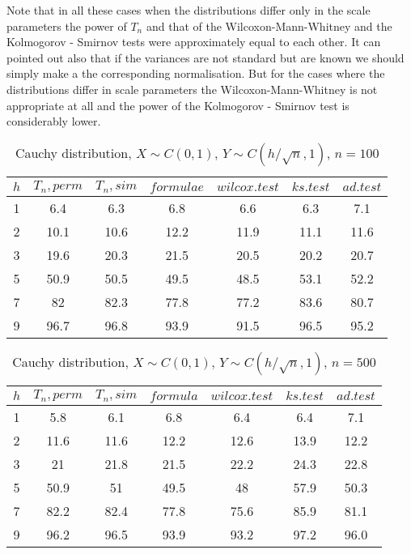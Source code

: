 \documentclass{svproc}
\begin{document}
Note that in all these cases when the distributions differ only in the scale parameters the power of  $T_n$ and  that of the Wilcoxon-Mann-Whitney and the
Kolmogorov - Smirnov tests were approximately equal to each other.
It can pointed out also that if the variances are not standard  but are known we should simply make a the corresponding normalisation.
But for the cases where the distributions differ in scale parameters the Wilcoxon-Mann-Whitney is not appropriate at all and the power of  the Kolmogorov - Smirnov test is considerably lower.


\begin{table}
  \caption{Cauchy distribution, $X\sim C(0,1)$, $Y\sim C(h/\sqrt{n},1)$, $n=100$}
  \begin{center}
  \begin{tabular}{c@{\quad}c@{\quad}c@{\quad}c@{\quad}c@{\quad}c@{\quad}c}
  \hline
  $h$ & $T_n, perm$ & $T_n, sim$ & $formulae$ & $wilcox.test$ & $ks.test$ & $ad.test$ \\
  \hline
  1 & 6.4 & 6.3 & 6.8 & 6.6 & 6.3 & 7.1\\
  2 & 10.1 & 10.6 & 12.2 & 11.9 & 11.1 & 11.6 \\
  3 & 19.6 & 20.3 & 21.5 & 20.5 & 20.2 & 20.7 \\
  5 & 50.9 & 50.5 & 49.5 & 48.5 & 53.1 & 52.2 \\
  7 & 82 & 82.3 & 77.8 & 77.2 & 83.6 & 80.7 \\
  9 & 96.7 & 96.8 & 93.9 & 91.5 & 96.5 & 95.2 \\
  \hline
  \end{tabular}
  \end{center}
\end{table}

\begin{table}
  \caption{Cauchy distribution, $X\sim C(0,1)$, $Y\sim C(h/\sqrt{n},1)$, $n=500$}
  \begin{center}
  \begin{tabular}{c@{\quad}c@{\quad}c@{\quad}c@{\quad}c@{\quad}c@{\quad}c}
  \hline
  $h$ & $T_n, perm$ & $T_n, sim$ & $formula$ & $wilcox.test$ & $ks.test$ & $ad.test$ \\
  \hline
  1 & 5.8   & 6.1      & 6.8       & 6.4           & 6.4      & 7.1 \\
  2 & 11.6  & 11.6     & 12.2      & 12.6          & 13.9     & 12.2 \\
  3 & 21    & 21.8     & 21.5      & 22.2          & 24.3     & 22.8 \\
  5 & 50.9  & 51       & 49.5      & 48            & 57.9     & 50.3 \\
  7 & 82.2  & 82.4     & 77.8      & 75.6          & 85.9     & 81.1 \\
  9 & 96.2  & 96.5     & 93.9      & 93.2          & 97.2     & 96.0 \\
  \hline
  \end{tabular}
  \end{center}
\end{table}
\end{document}
